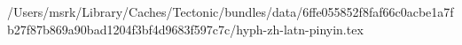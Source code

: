 /Users/msrk/Library/Caches/Tectonic/bundles/data/6ffe055852f8faf66c0acbe1a7fb27f87b869a90bad1204f3bf4d9683f597c7c/hyph-zh-latn-pinyin.tex